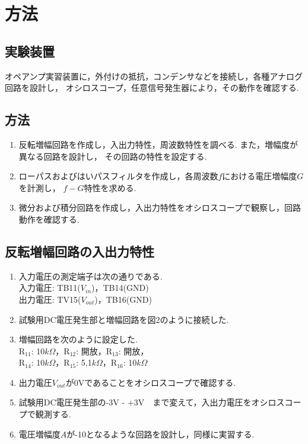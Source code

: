 \documentclass[twocolumn, 10pt,a4j]{jsarticle}
\begin{document}
\section{方法}
    \subsection{実験装置}
        オペアンプ実習装置に，外付けの抵抗，コンデンサなどを接続し，各種アナログ回路を設計し，
        オシロスコープ，任意信号発生器により，その動作を確認する.

    \subsection{方法}
        \begin{enumerate}
          \item 反転増幅回路を作成し，入出力特性，周波数特性を調べる. また，増幅度が異なる回路を設計し，
            その回路の特性を設定する. \\
          \item ローパスおよびはいパスフィルタを作成し，各周波数$f$における電圧増幅度$G$を計測し，
            $f - G$特性を求める.
          \item 微分および積分回路を作成し，入出力特性をオシロスコープで観察し，回路動作を確認する.
        \end{enumerate}
    
    \subsection{反転増幅回路の入出力特性}
        \begin{enumerate}
          \item 入力電圧の測定端子は次の通りである. \\
            入力電圧: TB11($V_{in}$)，TB14(GND) \\
            出力電圧: TV15($V_{out}$)，TB16(GND) \\
          \item 試験用DC電圧発生部と増幅回路を図2のように接続した. \\
          \item 増幅回路を次のように設定した. \\
            R$_{11}$: 10$k\Omega$，R$_{12}$: 開放，R$_{13}$: 開放， \\
            R$_{14}$: 10$k\Omega$，R$_{15}$: 5,1$k\Omega$，R$_{16}$: 10$k\Omega$
          \item 出力電圧$V_{out}$が0Vであることをオシロスコープで確認する.
          \item 試験用DC電圧発生部の-3V - +3V　まで変えて，入出力電圧をオシロスコープで観測する.
          \item 電圧増幅度$A$が-10となるような回路を設計し，同様に実習する.
        \end{enumerate}
\end{document}
